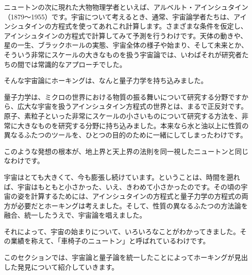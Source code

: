 \documentclass[10pt,b5paper,papersize,dvipdfmx]{jsbook}
\begin{document}
ニュートンの次に現れた大物物理学者といえば、アルベルト・アインシュタイン（1879～1955）です。宇宙について考えるとき、通常、宇宙論学者たちは、アインシュタインの方程式を使ってあれこれ計算します。さまざまな条件を仮定し、アインシュタインの方程式で計算してみて予測を行うわけです。天体の動きや、星の一生、ブラックホールの実態、宇宙全体の様子や始まり、そして未来とか、そういう非常にスケールの大きなものを扱う宇宙論では、いわばそれが研究者たちの間では常識的なアプローチでした。\par
そんな宇宙論にホーキングは、なんと量子力学を持ち込みました。\par
量子力学は、ミクロの世界における物質の振る舞いについて研究する分野ですから、広大な宇宙を扱うアインシュタイン方程式の世界とは、まるで正反対です。原子、素粒子といった非常にスケールの小さいものについて研究する方法を、非常に大きなものを研究する分野に持ち込みました。本来なら水と油以上に性質の異なるふたつのツールを、ひとつの目的のために一緒にしてしまったわけです。\par
このような発想の根本が、地上界と天上界の法則を同一視したニュートンと同じなわけです。\par
宇宙はとても大きくて、今も膨張し続けています。ということは、時間を遡れば、宇宙はもともと小さかった、いえ、きわめて小さかったのです。その頃の宇宙の姿を計算するためには、アインシュタインの方程式と量子力学の方程式の両方が必要だとホーキングは考えました。そして、性質の異なるふたつの方法論を融合、統一したうえで、宇宙論を唱えました。\par
それによって、宇宙の始まりについて、いろいろなことがわかってきました。その業績を称えて、「車椅子のニュートン」と呼ばれているわけです。\par
このセクションでは、宇宙論と量子論を統一したことによってホーキングが見出した発見について紹介していきます。\par
\end{document}
